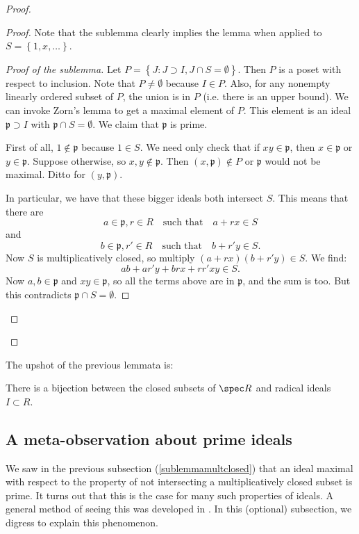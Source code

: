 \begin{proof}
\begin{proof}
Note that the sublemma clearly implies the lemma when applied to
$S =
\left\{1, x, \dots\right\}.$

\begin{proof}[Proof of the sublemma]
Let $P = \left\{J: J \supset I, J \cap S = \emptyset \right\}$.
Then $P$ is a
poset with respect to inclusion. Note that $P \neq \emptyset$
because $I \in P$. Also,
for any nonempty linearly ordered subset of $P$, the union is in
$P$ (i.e. there is an
upper bound).  
We can invoke Zorn's lemma to get a maximal element of $P$. This
element is an
ideal $\mathfrak{p} \supset I$ with $\mathfrak{p} \cap S =
\emptyset$. We claim
that $\mathfrak{p}$ is prime.

First of all, $1 \notin \mathfrak{p}$ because $1 \in S$. We need
only check
that if $xy \in \mathfrak{p}$, then $x \in \mathfrak{p}$ or $y
\in
\mathfrak{p}$. Suppose otherwise, so $x,y \notin \mathfrak{p}$.
Then $(x,\mathfrak{p}) \notin P$ or
$\mathfrak{p}$ would not be maximal. Ditto for $(y,
\mathfrak{p})$.

In particular, we have that these bigger ideals both intersect
$S$. This means
that there are 
\[ a \in \mathfrak{p} , r \in R \quad \text{such that}\quad a+rx
\in S \]
and 
\[ b \in \mathfrak{p} , r' \in R \quad \text{such that}\quad
b+r'y \in S .\]
Now $S$ is multiplicatively closed, so multiply $(a+rx)(b+r'y)
\in S$.
We find:
\[ ab + ar'y+brx+rr'xy \in S.  \]
Now $a,b \in \mathfrak{p}$ and $xy \in \mathfrak{p}$, so all the
terms above are in $\mathfrak{p}$, and the sum is too. But this contradicts
$\mathfrak{p}
\cap S = \emptyset$. 
\end{proof}
\end{proof} 
\end{proof} 
The upshot of the previous lemmata is:
\begin{proposition}
There is a bijection between the closed subsets of $\spec R$ and
radical ideals
$I \subset R$.
\end{proposition}

\subsection{A meta-observation about prime ideals}

We saw in the previous subsection (\cref{sublemmamultclosed})
that an ideal maximal with respect to the property of not intersecting a
multiplicatively closed subset is prime.
It turns out that this is the case for many such properties of ideals.
A general method of seeing this was developed in \cite{LaRe08}.
In this (optional) subsection, we digress to explain this phenomenon.

